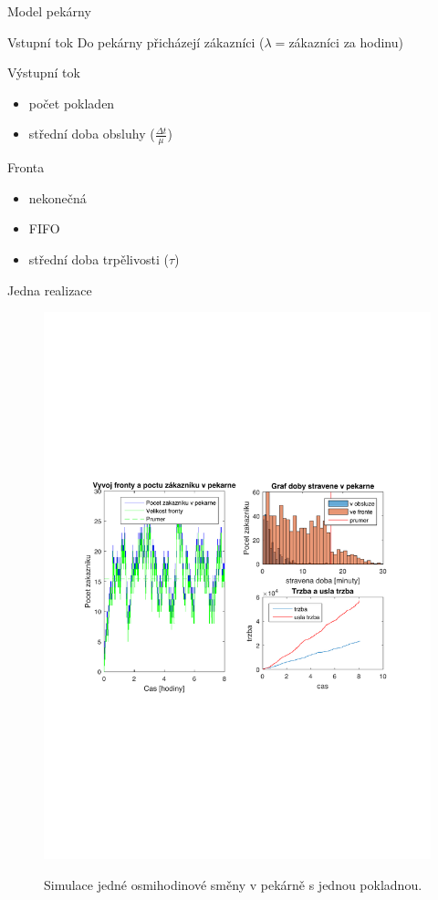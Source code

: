 \begin{frame}{Model pekárny}
    \begin{block}{Vstupní tok}
    Do pekárny přicházejí zákazníci (\(\lambda =\)zákazníci za hodinu)
    \end{block}
    \begin{block}{Výstupní tok}
    \begin{itemize}
    \item počet pokladen
    \item střední doba obsluhy (\(\frac{\Delta t}{\mu}\))
    \end{itemize}
    \end{block}
    \begin{block}{Fronta}
    \begin{itemize}
    \item nekonečná
    \item FIFO
    \item střední doba trpělivosti (\(\tau\))
    \end{itemize}
    \end{block}
\end{frame}
\begin{frame}{Jedna realizace}
    \begin{figure}
\centering
\includegraphics[width=0.8\columnwidth]{imgs/jedenPrubeh.pdf}
\label{fig:jedenPrubeh}
\caption{Simulace jedné osmihodinové směny v pekárně s jednou pokladnou.}
\end{figure}
\end{frame}
